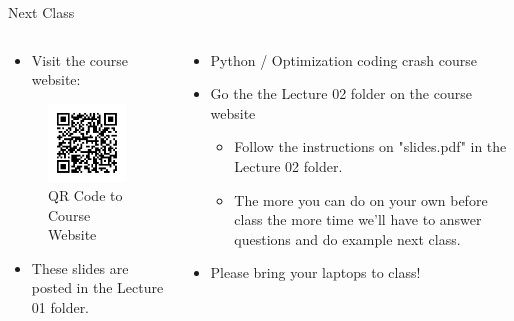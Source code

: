 \documentclass[10pt, aspectratio=169]{beamer}
\begin{document}
\begin{frame}[t]{Next Class}
    \begin{columns}[t]
        \begin{column}[t]{0.5\textwidth}
            \begin{itemize}
                \item Visit the course website:
            \end{itemize}
            \begin{figure}
                \includegraphics[width=0.4\linewidth]{../CourseQRCode.png}
                \caption{QR Code to Course Website}
            \end{figure}
            \begin{itemize}
                \item These slides are posted in the Lecture 01 folder.
            \end{itemize}
        \end{column}
        \begin{column}[t]{0.5\textwidth}
            \begin{itemize}
                \item Python / Optimization coding crash course
                \item Go the the Lecture 02 folder on the course website
                \begin{itemize}
                    \item Follow the instructions on "slides.pdf" in the Lecture 02 folder.
                    \item The more you can do on your own before class the more time we'll have to answer questions and do example next class.
                \end{itemize}
                \item Please bring your laptops to class!
            \end{itemize}
        \end{column}
    \end{columns}

\end{frame}
\end{document}
